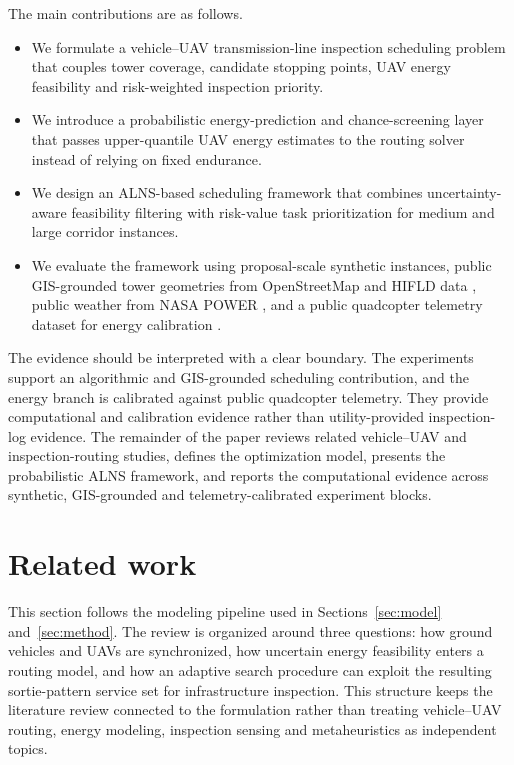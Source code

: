 The main contributions are as follows.
\begin{itemize}
  \item We formulate a vehicle--UAV transmission-line inspection scheduling problem that couples tower coverage, candidate stopping points, UAV energy feasibility and risk-weighted inspection priority.
  \item We introduce a probabilistic energy-prediction and chance-screening layer that passes upper-quantile UAV energy estimates to the routing solver instead of relying on fixed endurance.
  \item We design an ALNS-based scheduling framework that combines uncertainty-aware feasibility filtering with risk-value task prioritization for medium and large corridor instances.
  \item We evaluate the framework using proposal-scale synthetic instances, public GIS-grounded tower geometries from OpenStreetMap and HIFLD data \citep{openstreetmap2026,hifld2026transmission}, public weather from NASA POWER \citep{nasaPower2026}, and a public quadcopter telemetry dataset for energy calibration \citep{airlab2021dataset}.
\end{itemize}

The evidence should be interpreted with a clear boundary. The experiments support an algorithmic and GIS-grounded scheduling contribution, and the energy branch is calibrated against public quadcopter telemetry. They provide computational and calibration evidence rather than utility-provided inspection-log evidence. The remainder of the paper reviews related vehicle--UAV and inspection-routing studies, defines the optimization model, presents the probabilistic ALNS framework, and reports the computational evidence across synthetic, GIS-grounded and telemetry-calibrated experiment blocks.

\section{Related work}
\label{sec:related}

This section follows the modeling pipeline used in Sections~\ref{sec:model} and~\ref{sec:method}. The review is organized around three questions: how ground vehicles and UAVs are synchronized, how uncertain energy feasibility enters a routing model, and how an adaptive search procedure can exploit the resulting sortie-pattern service set for infrastructure inspection. This structure keeps the literature review connected to the formulation rather than treating vehicle--UAV routing, energy modeling, inspection sensing and metaheuristics as independent topics.

